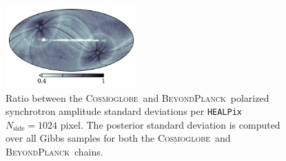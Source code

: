\documentclass[twocolumn]{../../common/aa}
\def\WMAP{\emph{WMAP}}
\def\WMAPnine{\emph{WMAP9}}
\def\Planck{\emph{Planck}}
\def\healpix{\texttt{HEALPix}}
\def\commanderthree{\texttt{Commander3}}
\newcommand{\bp}{\textsc{BeyondPlanck}}
\newcommand{\cosmoglobe}{\textsc{Cosmoglobe}}
\newcommand{\K}[0]{\textit K}
\begin{document}



\begin{figure}
	\centering
	\includegraphics[width=0.45\textwidth]{figures/polint_sigma_ratio.pdf}
	\caption{
		Ratio between the \cosmoglobe\ and \bp\ polarized synchrotron amplitude standard deviations per \healpix\ $N_{\mathrm{side}}=1024$ pixel. The posterior standard deviation is computed over all Gibbs samples for both the \cosmoglobe\ and \bp\ chains.
		}
		\label{fig:rms_ratios}
\end{figure}
\end{document}
